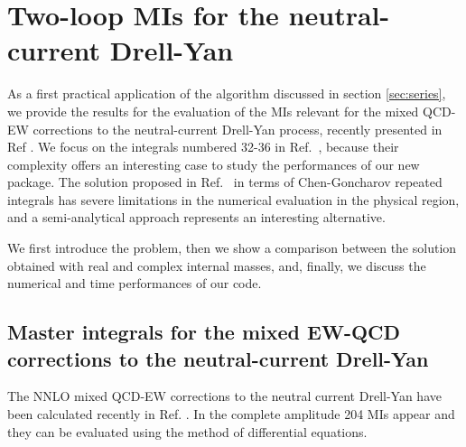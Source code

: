 
\section{Two-loop MIs for the neutral-current Drell-Yan}
\label{sec:results}

As a first practical application of the algorithm discussed in section \ref{sec:series}, we provide the results for the evaluation of the MIs relevant for the mixed QCD-EW corrections to the neutral-current Drell-Yan process, recently presented in Ref \cite{Armadillo:2022bgm}. 
%
We focus on the integrals numbered 32-36 in Ref.~\cite{Bonciani:2016ypc},
because their complexity offers an interesting case to study the performances of our new package. The solution proposed in Ref.~\cite{Bonciani:2016ypc} in terms of Chen-Goncharov repeated integrals has severe limitations in the numerical evaluation in the physical region, and a semi-analytical approach represents an interesting alternative.

We first introduce the problem, then we show a comparison between the solution obtained with real and complex internal masses, and, finally, we discuss the numerical and time performances of our code. 

\subsection{Master integrals for the mixed EW-QCD corrections to the neutral-current Drell-Yan}

The NNLO mixed QCD-EW corrections to the neutral current Drell-Yan have been calculated recently in Ref. \cite{Armadillo:2022bgm}.
In the complete amplitude 204 MIs appear and they can be evaluated using the method of differential equations. 

